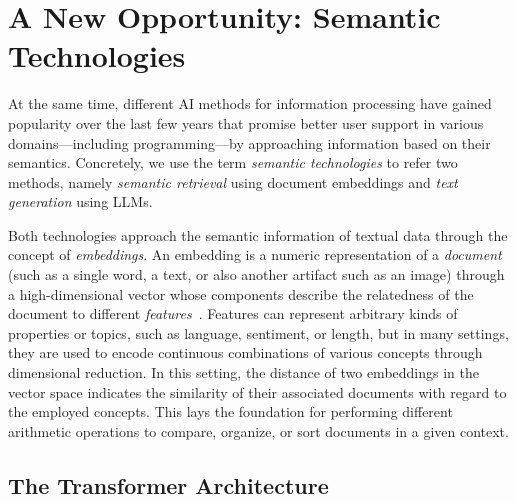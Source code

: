 
\section{A New Opportunity: Semantic Technologies}
\label{sec:background/semtec}

At the same time, different AI methods for information processing have gained popularity over the last few years that promise better user support in various domains---including programming---by approaching information based on their semantics.
Concretely, we use the term \emph{semantic technologies} to refer two methods, namely \emph{semantic retrieval} using document embeddings and \emph{text generation} using LLMs.

Both technologies approach the semantic information of textual data through the concept of \emph{embeddings}.
An embedding is a numeric representation of a \emph{document} (such as a single word, a text, or also another artifact such as an image) through a high-dimensional vector whose components describe the relatedness of the document to different \emph{features}~\cite{mikolov2013efficient,devlin2019bert}.
Features can represent arbitrary kinds of properties or topics, such as language, sentiment, or length, but in many settings, they are used to encode continuous combinations of various concepts through dimensional reduction.
In this setting, the distance of two embeddings in the vector space indicates the similarity of their associated documents with regard to the employed concepts.
This lays the foundation for performing different arithmetic operations to compare, organize, or sort documents in a given context.

\subsection{The Transformer Architecture}

